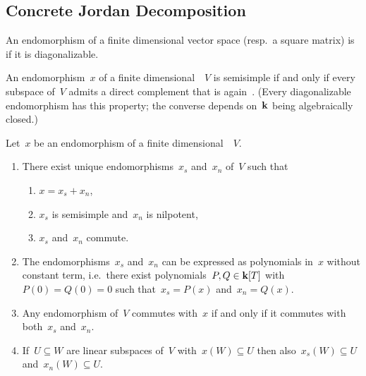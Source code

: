 \subsection{Concrete Jordan Decomposition}


\begin{definition}
  An endomorphism of a finite dimensional vector space (resp.\ a square matrix) is  if it is diagonalizable.
\end{definition}


\begin{remark}
  An endomorphism~$x$ of a finite dimensional~{\vectorspace{$\kf$}}~$V$ is semisimple if and only if every~{} subspace of~$V$ admits a direct complement that is again~{}.
  (Every diagonalizable endomorphism has this property;
  the converse depends on~$\kf$ being algebraically closed.)
\end{remark}


\begin{theorem}
\label{concrete jordan decomposition}
  Let~$x$ be an endomorphism of a finite dimensional~{\vectorspace{$\kf$}}~$V$.
  \begin{enumerate}
    \item
      \label{existence and uniqueness of concrete jcd}
      There exist unique endomorphisms~$x_s$ and~$x_n$ of~$V$ such that
      \begin{enumerate}
        \item
          $x = x_s + x_n$,
        \item
          $x_s$ is semisimple and~$x_n$ is nilpotent,
        \item
          $x_s$ and~$x_n$ commute.
      \end{enumerate}
    \item
      \label{concrete jcd are polynomial}
      The endomorphisms~$x_s$ and~$x_n$ can be expressed as polynomials in~$x$ without constant term, i.e.\ there exist polynomials~$P,Q \in \mathbf{k}[T]$ with~$P(0) = Q(0) = 0$ such that~$x_s = P(x)$ and~$x_n = Q(x)$.
    \item
      \label{commuting via concrete jcd}
      Any endomorphism of~$V$ commutes with~$x$ if and only if it commutes with both~$x_s$ and~$x_n$.
    \item
      \label{concrete jcd compatible with mapping of subspaces}
      If~$U \subseteq W$ are linear subspaces of~$V$ with~$x(W) \subseteq U$ then also~$x_s(W) \subseteq U$ and~$x_n(W) \subseteq U$.
  \end{enumerate}
\end{theorem}


